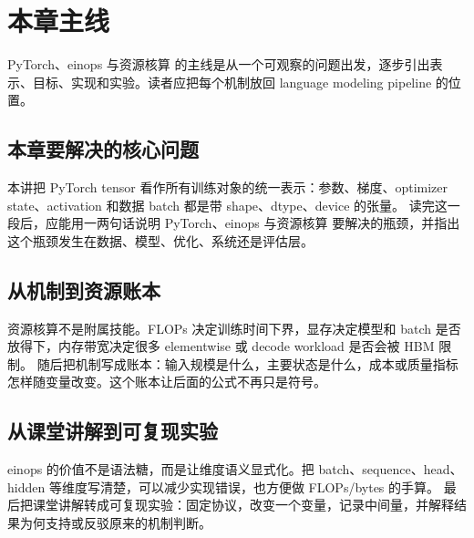 \documentclass[a4paper]{article}
\begin{document}
\section{本章主线}
PyTorch、einops 与资源核算 的主线是从一个可观察的问题出发，逐步引出表示、目标、实现和实验。读者应把每个机制放回 language modeling pipeline 的位置。
\subsection{本章要解决的核心问题}
本讲把 PyTorch tensor 看作所有训练对象的统一表示：参数、梯度、optimizer state、activation 和数据 batch 都是带 shape、dtype、device 的张量。
读完这一段后，应能用一两句话说明 PyTorch、einops 与资源核算 要解决的瓶颈，并指出这个瓶颈发生在数据、模型、优化、系统还是评估层。
\subsection{从机制到资源账本}
资源核算不是附属技能。FLOPs 决定训练时间下界，显存决定模型和 batch 是否放得下，内存带宽决定很多 elementwise 或 decode workload 是否会被 HBM 限制。
随后把机制写成账本：输入规模是什么，主要状态是什么，成本或质量指标怎样随变量改变。这个账本让后面的公式不再只是符号。
\subsection{从课堂讲解到可复现实验}
einops 的价值不是语法糖，而是让维度语义显式化。把 batch、sequence、head、hidden 等维度写清楚，可以减少实现错误，也方便做 FLOPs/bytes 的手算。
最后把课堂讲解转成可复现实验：固定协议，改变一个变量，记录中间量，并解释结果为何支持或反驳原来的机制判断。
\end{document}
